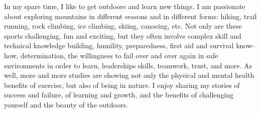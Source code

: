 \documentclass[11pt,notitlepage,english]{report}
\begin{document}
In my spare time, I like to get outdoors and learn new things. I am passionate
about exploring mountains in different seasons and in different forms: hiking,
trail running, rock climbing, ice climbing, skiing, canoeing, etc. Not only are
these sports challenging, fun and exciting, but they often involve complex
skill and technical knowledge building, humility, preparedness, first aid and
survival know-how, determination, the willingness to fail over and over again
in safe environments in order to learn, leaderships skills, teamwork, trust,
and more. As well, more and more studies are showing not only the physical and
mental health benefits of exercise, but also of being in nature. I enjoy
sharing my stories of success and failure, of learning and growth, and the
benefits of challenging yourself and the beauty of the outdoors.
\end{document}
